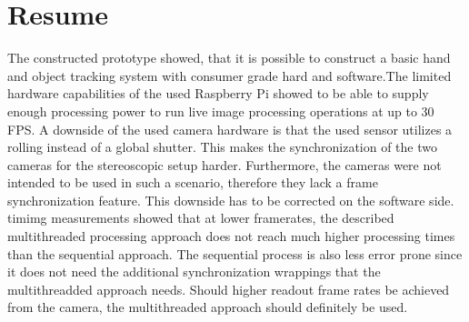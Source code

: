 \chapter{Resume}
The constructed prototype showed, that it is possible to construct a basic hand and object tracking system with consumer grade hard and software.The limited hardware capabilities of the used Raspberry Pi showed to be able to supply enough processing power to run live image processing operations at up to 30 FPS. A downside of the used camera hardware is that the used sensor utilizes a rolling instead of a global shutter. This makes the synchronization of the two cameras for the stereoscopic setup harder. Furthermore, the cameras were not intended to be used in such a scenario, therefore they lack a frame synchronization feature. This downside has to be corrected on the software side.
timimg measurements showed that at lower framerates, the described multithreaded processing approach does not reach much higher processing times than the sequential approach. The sequential process is also less error prone since it does not need the additional synchronization wrappings that the multithreadded approach needs. Should higher readout frame rates be achieved from the camera, the multithreaded approach should definitely be used.

